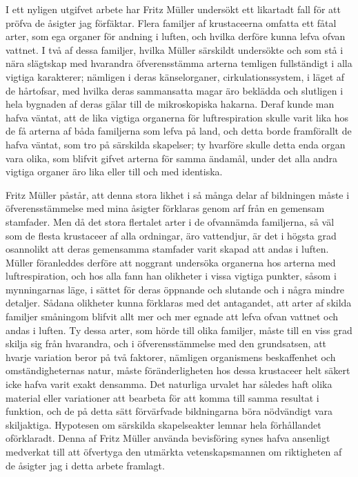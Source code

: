 I ett nyligen utgifvet arbete har Fritz Müller undersökt ett likartadt fall för att pröfva de åsigter jag förfäktar. Flera familjer af krustaceerna omfatta ett fåtal arter, som ega organer för andning i luften, och hvilka derföre kunna lefva ofvan vattnet. I två af dessa familjer, hvilka Müller särskildt undersökte och som stå i nära slägtskap med hvarandra öfverensstämma arterna temligen fullständigt i alla vigtiga karakterer; nämligen i deras känselorganer, cirkulationssystem, i läget af de hårtofsar, med hvilka deras sammansatta magar äro beklädda och slutligen i hela bygnaden af deras gälar till de mikroskopiska hakarna. Deraf kunde man hafva väntat, att de lika vigtiga organerna för luftrespiration skulle varit lika hos de få arterna af båda familjerna som lefva på land, och detta borde framförallt de hafva väntat, som tro på särskilda skapelser; ty hvarföre skulle detta enda organ vara olika, som blifvit gifvet arterna för samma ändamål, under det alla andra vigtiga organer äro lika eller till och med identiska.

Fritz Müller påstår, att denna stora likhet i så många delar af bildningen måste i öfverensstämmelse med mina åsigter förklaras genom arf från en gemensam stamfader. Men då det stora flertalet arter i de ofvannämda familjerna, så väl som de flesta krustaceer af alla ordningar, äro vattendjur, är det i högsta grad osannolikt att deras gemensamma stamfader varit skapad att andas i luften. Müller föranleddes derföre att noggrant undersöka organerna hos arterna med luftrespiration, och hos alla fann han olikheter i vissa vigtiga punkter, såsom i mynningarnas läge, i sättet för deras öppnande och slutande och i några mindre detaljer. Sådana olikheter kunna förklaras med det antagandet, att arter af skilda familjer småningom blifvit allt mer och mer egnade att lefva ofvan vattnet och andas i luften. Ty dessa arter, som hörde till olika familjer, måste till en viss grad skilja sig från hvarandra, och i öfverensstämmelse med den grundsatsen, att hvarje variation beror på två faktorer, nämligen organismens beskaffenhet och omständigheternas natur, måste föränderligheten hos dessa krustaceer helt säkert icke hafva varit exakt densamma. Det naturliga urvalet har således haft olika material eller variationer att bearbeta för att komma till samma resultat i funktion, och de på detta sätt förvärfvade bildningarna böra nödvändigt vara skiljaktiga. Hypotesen om särskilda skapelseakter lemnar hela förhållandet oförklaradt. Denna af Fritz Müller använda bevisföring synes hafva ansenligt medverkat till att öfvertyga den utmärkta vetenskapsmannen om riktigheten af de åsigter jag i detta arbete framlagt.

